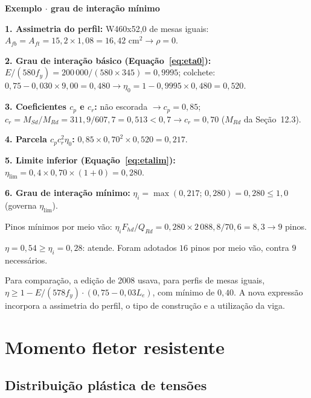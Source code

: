 \documentclass[11pt,a4paper]{article}
\newcommand{\caixaexemplo}[2]{%
  \par\vspace{6pt}\noindent\colorbox{examplebg}{%
    \parbox{\dimexpr\linewidth-2\fboxsep\relax}{%
      \vspace{4pt}\textbf{\color{exampleaccent}#1}\par\vspace{3pt}#2\vspace{4pt}%
    }%
  }\par\vspace{6pt}%
}
\begin{document}
\caixaexemplo{Exemplo $\cdot$ grau de interação mínimo}{%
\textbf{1. Assimetria do perfil:} W460x52,0 de mesas iguais: $A_{fb} = A_{ft} = 15{,}2 \times 1{,}08 = 16{,}42\text{ cm}^2 \rightarrow \rho = 0$.\par
\textbf{2. Grau de interação básico (Equação~\ref{eq:eta0}):} $E/(580 f_y) = 200\,000/(580 \times 345) = 0{,}9995$; colchete: $0{,}75 - 0{,}030 \times 9{,}00 = 0{,}480 \rightarrow \eta_0 = 1 - 0{,}9995 \times 0{,}480 = 0{,}520$.\par
\textbf{3. Coeficientes $c_p$ e $c_r$:} não escorada $\rightarrow c_p = 0{,}85$; $c_r = M_{Sd}/M_{Rd} = 311{,}9/607{,}7 = 0{,}513 < 0{,}7 \rightarrow c_r = 0{,}70$ ($M_{Rd}$ da Seção~12.3).\par
\textbf{4. Parcela $c_p c_r^2 \eta_0$:} $0{,}85 \times 0{,}70^2 \times 0{,}520 = 0{,}217$.\par
\textbf{5. Limite inferior (Equação~\ref{eq:etalim}):} $\eta_{\text{lim}} = 0{,}4 \times 0{,}70 \times (1 + 0) = 0{,}280$.\par
\textbf{6. Grau de interação mínimo:} $\eta_i = \max(0{,}217;\, 0{,}280) = 0{,}280 \le 1{,}0$ (governa $\eta_{\text{lim}}$).\par
Pinos mínimos por meio vão: $\eta_i F_{hd}/Q_{Rd} = 0{,}280 \times 2\,088{,}8/70{,}6 = 8{,}3 \rightarrow 9$ pinos.\par
$\eta = 0{,}54 \ge \eta_i = 0{,}28$: atende. Foram adotados $16$ pinos por meio vão, contra $9$ necessários.}

Para comparação, a edição de 2008 usava, para perfis de mesas iguais, $\eta \ge 1 - E/(578 f_y)\cdot(0{,}75 - 0{,}03 L_e)$, com mínimo de $0{,}40$. A nova expressão incorpora a assimetria do perfil, o tipo de construção e a utilização da viga.

\section{Momento fletor resistente}

\subsection{Distribuição plástica de tensões}
\end{document}
